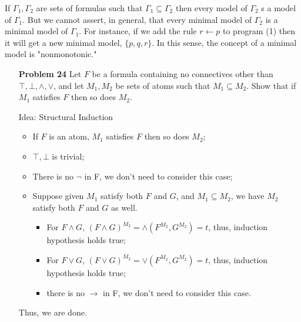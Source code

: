 \documentclass[12pt]{article}
\begin{document}
\noindent If $\Gamma_1, \Gamma_2$ are sets of formulas such that $\Gamma_1 \subseteq \Gamma_2$ then every model of $\Gamma_2$ s a model of $\Gamma_1$. But we cannot assert, in general, that every minimal model of $\Gamma_2$ is a minimal model of $\Gamma_1$. For instance, if we add the rule $r \leftarrow p$ to program (1) then it will get a new minimal model, $\{p, q, r\}$. In this sense, the concept of a minimal model is "nonmonotonic."

\begin{enumerate}
\item[\textbf{Problem 24}] Let $F$ be a formula containing no connectives other than $\top, \bot, \wedge, \vee$, and let $M_1, M_2$ be sets of atoms such that $M_1 \subseteq M_2$. Show that if $M_1$ satisfies $F$ then so does $M_2$. 

Idea: Structural Induction \\

\begin{itemize}
\item If $F$ is an atom, $M_1$ satisfies $F$ then so does $M_2$;
\item $\top, \bot$ is trivial;
\item There is no $\neg$ in F, we don't need to consider this case;
\item Suppose given $M_1$ satisfy both $F$ and $G$, and $M_1 \subseteq M_2$, we have $M_2$ satisfy both $F$ and $G$ as well. 
    \begin{itemize}
        \item For $F \wedge G$, $(F \wedge G)^{M_2} = \wedge (F^{M_2}, G^{M_2}) = t$, thus, induction hypothesis holds true;
        \item For $F \vee G$, $(F \vee G)^{M_2} = \vee (F^{M_2}, G^{M_2}) = t$, thus, induction hypothesis holds true;
        \item there is no $\rightarrow$ in F, we don't need to consider this case. 
    \end{itemize}
\end{itemize}
Thus, we are done. 



\end{enumerate}
\end{document}
